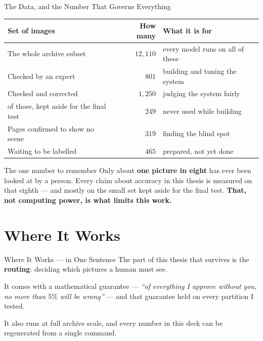 \documentclass[aspectratio=169,11pt]{beamer}
\begin{document}
\begin{frame}{The Data, and the Number That Governs Everything}
\small
\begin{center}
\footnotesize
\begin{tabular}{@{}l r l@{}}
\toprule
\textbf{Set of images} & \textbf{How many} & \textbf{What it is for} \\
\midrule
The whole archive subset & $12{,}110$ & every model runs on all of these \\
Checked by an expert & $801$ & building and tuning the system \\
Checked and corrected & $1{,}250$ & judging the system fairly \\
\quad of those, kept aside for the final test & $249$ & never used while building \\
Pages confirmed to show no scene & $319$ & finding the blind spot \\
Waiting to be labelled & $465$ & prepared, not yet done \\
\bottomrule
\end{tabular}
\end{center}
\vspace{3mm}

\begin{alertblock}{\small The one number to remember}
\footnotesize Only about \textbf{one picture in eight} has ever been looked at by a person. Every claim about accuracy in this thesis is measured on that eighth --- and mostly on the small set kept aside for the final test. \textbf{That, not computing power, is what limits this work.}
\end{alertblock}
\end{frame}


\section{Where It Works}

\begin{frame}{Where It Works --- in One Sentence}
\large
The part of this thesis that survives is the \textbf{routing}: deciding which pictures a human must see.
\vspace{4mm}

It comes with a mathematical guarantee --- \emph{``of everything I approve without you, no more than $5\%$ will be wrong''} --- and that guarantee held on every partition I tested.
\vspace{4mm}

\normalsize It also runs at full archive scale, and every number in this deck can be regenerated from a single command.
\end{frame}
\end{document}
